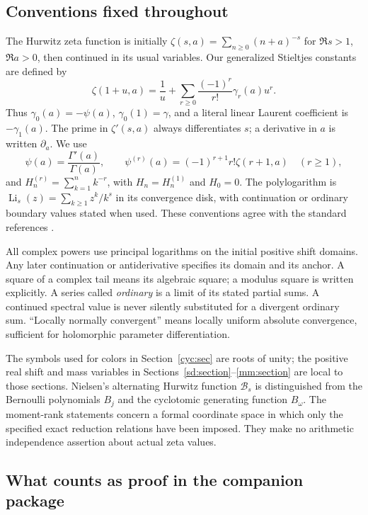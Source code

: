 \subsection{Conventions fixed throughout}

The Hurwitz zeta function is initially
$\zeta(s,a)=\sum_{n\ge0}(n+a)^{-s}$ for $\Re s>1$, $\Re a>0$,
then continued in its usual variables. Our generalized Stieltjes
constants are defined by
\begin{equation}\label{intro:stieltjes}
 \zeta(1+u,a)=\frac1u+
       \sum_{r\ge0}\frac{(-1)^r}{r!}\gamma_r(a)u^r.
\end{equation}
Thus $\gamma_0(a)=-\psi(a)$, $\gamma_0(1)=\gamma$, and a literal
linear Laurent coefficient is $-\gamma_1(a)$.
The prime in $\zeta'(s,a)$ always differentiates $s$; a derivative
in $a$ is written $\partial_a$. We use
\[
 \psi(a)=\frac{\Gamma'(a)}{\Gamma(a)},\qquad
 \psi^{(r)}(a)=(-1)^{r+1}r!\zeta(r+1,a)\quad(r\ge1),
\]
and $H_n^{(r)}=\sum_{k=1}^{n}k^{-r}$, with $H_n=H_n^{(1)}$ and
$H_0=0$. The polylogarithm is
$\operatorname{Li}_s(z)=\sum_{k\ge1}z^k/k^s$ in its convergence
disk, with continuation or ordinary boundary values stated when used.
These conventions agree with the standard references
\cite{DLMFZeta,DLMFPolylog,DLMFPolygamma}.

All complex powers use principal logarithms on the initial positive
shift domains. Any later continuation or antiderivative specifies its
domain and its anchor. A square of a complex tail means its algebraic
square; a modulus square is written explicitly. A series called
\emph{ordinary} is a limit of its stated partial sums. A continued
spectral value is never silently substituted for a divergent ordinary
sum. ``Locally normally convergent'' means locally uniform absolute
convergence, sufficient for holomorphic parameter differentiation.

The symbols used for colors in Section~\ref{cyc:sec} are roots of
unity; the positive real shift and mass variables in
Sections~\ref{sd:section}--\ref{mm:section} are local to those sections.
Nielsen's alternating Hurwitz function $\mathcal B_s$ is distinguished
from the Bernoulli polynomials $B_j$ and the cyclotomic generating
function $B_\omega$. The moment-rank statements concern a formal
coordinate space in which only the specified exact reduction relations
have been imposed. They make no arithmetic independence assertion
about actual zeta values.

\subsection{What counts as proof in the companion package}

